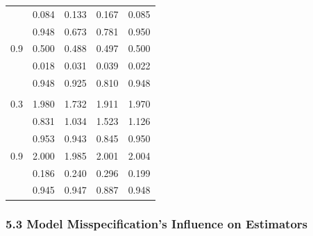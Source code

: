 \documentclass[
  12pt,
]{article}
\begin{document}
\begin{table}[H]
\begin{tabular}[t]{rrrrr}
\hspace{1em} & 0.084 & 0.133 & 0.167 & 0.085\\
\hspace{1em} & 0.948 & 0.673 & 0.781 & 0.950\\
\hspace{1em}0.9 & 0.500 & 0.488 & 0.497 & 0.500\\
\hspace{1em} & 0.018 & 0.031 & 0.039 & 0.022\\
\hspace{1em} & 0.948 & 0.925 & 0.810 & 0.948\\
\addlinespace[0.3em]
\multicolumn{5}{l}{\textbf{$\beta_2 = 2$}}\\
\hspace{1em}0.3 & 1.980 & 1.732 & 1.911 & 1.970\\
\hspace{1em} & 0.831 & 1.034 & 1.523 & 1.126\\
\hspace{1em} & 0.953 & 0.943 & 0.845 & 0.950\\
\hspace{1em}0.9 & 2.000 & 1.985 & 2.001 & 2.004\\
\hspace{1em} & 0.186 & 0.240 & 0.296 & 0.199\\
\hspace{1em} & 0.945 & 0.947 & 0.887 & 0.948\\
\bottomrule
\end{tabular}
\end{table}

\hypertarget{model-misspecifications-influence-on-estimators}{%
\subsubsection{5.3 Model Misspecification's Influence on
Estimators}\label{model-misspecifications-influence-on-estimators}}
\end{document}

